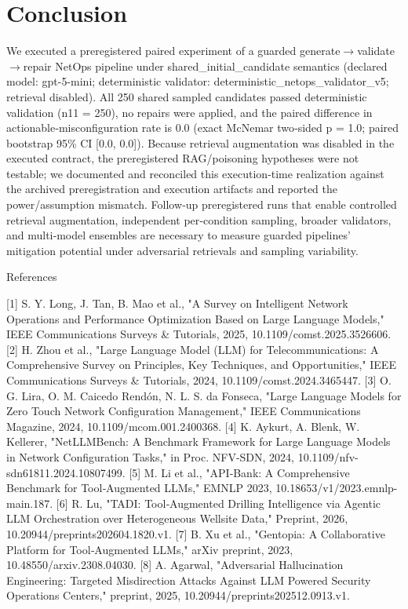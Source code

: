 \documentclass[conference]{IEEEtran}
\begin{document}
\section{Conclusion}
We executed a preregistered paired experiment of a guarded generate\ensuremath{\rightarrow}validate\ensuremath{\rightarrow}repair NetOps pipeline under shared\_initial\_candidate semantics (declared model: gpt-5-mini; deterministic validator: deterministic\_netops\_validator\_v5; retrieval disabled). All 250 shared sampled candidates passed deterministic validation (n11 = 250), no repairs were applied, and the paired difference in actionable‑misconfiguration rate is 0.0 (exact McNemar two‑sided p = 1.0; paired bootstrap 95\% CI [0.0, 0.0]). Because retrieval augmentation was disabled in the executed contract, the preregistered RAG/poisoning hypotheses were not testable; we documented and reconciled this execution‑time realization against the archived preregistration and execution artifacts and reported the power/assumption mismatch. Follow‑up preregistered runs that enable controlled retrieval augmentation, independent per‑condition sampling, broader validators, and multi‑model ensembles are necessary to measure guarded pipelines' mitigation potential under adversarial retrievals and sampling variability.

References

[1] S. Y. Long, J. Tan, B. Mao et al., "A Survey on Intelligent Network Operations and Performance Optimization Based on Large Language Models," IEEE Communications Surveys \& Tutorials, 2025, 10.1109/comst.2025.3526606.
[2] H. Zhou et al., "Large Language Model (LLM) for Telecommunications: A Comprehensive Survey on Principles, Key Techniques, and Opportunities," IEEE Communications Surveys \& Tutorials, 2024, 10.1109/comst.2024.3465447.
[3] O. G. Lira, O. M. Caicedo Rendón, N. L. S. da Fonseca, "Large Language Models for Zero Touch Network Configuration Management," IEEE Communications Magazine, 2024, 10.1109/mcom.001.2400368.
[4] K. Aykurt, A. Blenk, W. Kellerer, "NetLLMBench: A Benchmark Framework for Large Language Models in Network Configuration Tasks," in Proc. NFV-SDN, 2024, 10.1109/nfv-sdn61811.2024.10807499.
[5] M. Li et al., "API‑Bank: A Comprehensive Benchmark for Tool‑Augmented LLMs," EMNLP 2023, 10.18653/v1/2023.emnlp-main.187.
[6] R. Lu, "TADI: Tool‑Augmented Drilling Intelligence via Agentic LLM Orchestration over Heterogeneous Wellsite Data," Preprint, 2026, 10.20944/preprints202604.1820.v1.
[7] B. Xu et al., "Gentopia: A Collaborative Platform for Tool‑Augmented LLMs," arXiv preprint, 2023, 10.48550/arxiv.2308.04030.
[8] A. Agarwal, "Adversarial Hallucination Engineering: Targeted Misdirection Attacks Against LLM Powered Security Operations Centers," preprint, 2025, 10.20944/preprints202512.0913.v1.
\end{document}
